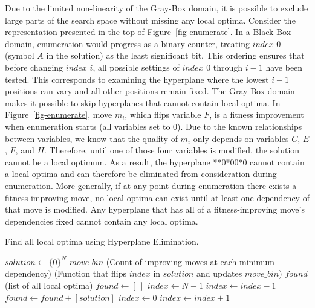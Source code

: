 \documentclass[runningheads,a4paper]{llncs}
\begin{document}
Due to the limited non-linearity of the Gray-Box domain, it is possible to exclude large
parts of the search space without missing any local optima.
Consider the representation presented in the top of Figure~\ref{fig-enumerate}. In a Black-Box
domain, enumeration would progress as a binary counter, treating $index$ 0 (symbol $A$ in the solution) as
the least significant bit. This ordering ensures that before changing $index$ $i$, all possible settings of $index$
0 through $i-1$ have been tested. This corresponds to examining the hyperplane where the lowest $i-1$ positions
can vary and all other positions remain fixed. The Gray-Box domain makes it possible to skip hyperplanes
that cannot contain local optima. In Figure~\ref{fig-enumerate}, move $m_i$, which flips variable $F$, is a fitness improvement
when enumeration starts (all variables set to 0). Due to the known relationships between variables,
we know that the quality of $m_i$ only depends on variables $C$, $E$, $F$, and $H$.
Therefore, until one of those four variables is modified, the solution cannot be a local optimum.
As a result, the hyperplane **0*00*0 cannot contain a local optima and can
therefore be eliminated from consideration during enumeration.
More generally, if at any point during enumeration
there exists a fitness-improving move, no local optima can exist until at least one
dependency of that move is modified. Any hyperplane that has all of a fitness-improving
move's dependencies fixed cannot contain any local optima.

\begin{algorithm}
  \caption{Find all local optima using Hyperplane Elimination.}
  \label{alg-enumerate}
  \begin{algorithmic}[1]
    \Require $solution \leftarrow \{0\}^N$
    \Require $move\_bin$ (Count of improving moves at each minimum dependency)
    \Require {} (Function that flips $index$ in $solution$ and updates $move\_bin$)
    \Ensure $found$ (list of all local optima)
    \State $found \leftarrow [~]$
    \State $index \leftarrow N-1$
      \label{alg-enumerate-bincheck}
        \State $index \leftarrow index-1$
      \EndWhile
        \State $found \leftarrow found + [solution]$
        \State $index \leftarrow 0$
      \EndIf
      \label{alg-enumerate-counter}
        \State {}
        \State $index \leftarrow index + 1$
      \EndWhile
        \State {}\label{alg-enumerate-insert}
      \EndIf
    \EndWhile
  \end{algorithmic}
\end{algorithm}
\end{document}
